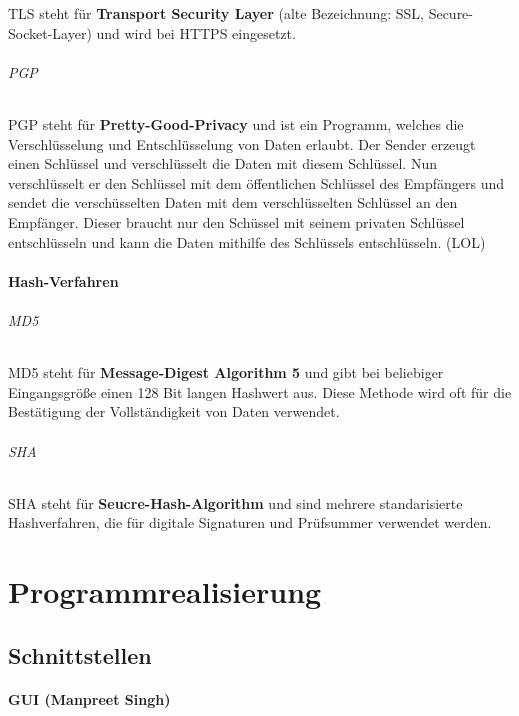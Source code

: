 \documentclass[12pt,a4paper]{report}
\begin{document}
TLS steht für \textbf{Transport Security Layer} (alte Bezeichnung: SSL, Secure-Socket-Layer) und wird bei HTTPS eingesetzt.

\paragraph{PGP}

PGP steht für \textbf{Pretty-Good-Privacy} und ist ein Programm, welches die Verschlüsselung und Entschlüsselung von Daten erlaubt. Der Sender erzeugt einen Schlüssel und verschlüsselt die Daten mit diesem Schlüssel. Nun verschlüsselt er den Schlüssel mit dem öffentlichen Schlüssel des Empfängers und sendet die verschüsselten Daten mit dem verschlüsselten Schlüssel an den Empfänger. Dieser braucht nur den Schüssel mit seinem privaten Schlüssel entschlüsseln und kann die Daten mithilfe des Schlüssels entschlüsseln. (LOL)

\subsection{Hash-Verfahren}

\paragraph{MD5}

MD5 steht für \textbf{Message-Digest Algorithm 5} und gibt bei beliebiger Eingangsgröße einen 128 Bit langen Hashwert aus. Diese Methode wird oft für die Bestätigung der Vollständigkeit von Daten verwendet.

\paragraph{SHA}

SHA steht für \textbf{Seucre-Hash-Algorithm} und sind mehrere standarisierte Hashverfahren, die für digitale Signaturen und Prüfsummer verwendet werden.

\part{Programmrealisierung}

\chapter{Schnittstellen}

\subsection{GUI (Manpreet Singh)}
\end{document}
